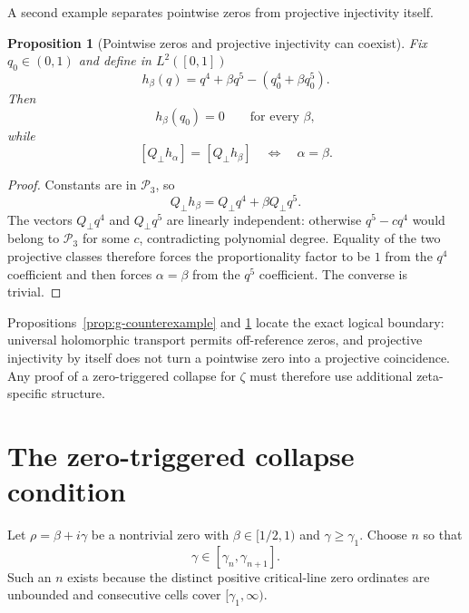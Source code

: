 \documentclass[11pt]{amsart}
\numberwithin{equation}{section}
\newtheorem{proposition}[theorem]{Proposition}
\newcommand{\Pcal}{\mathcal P}
\begin{document}
A second example separates pointwise zeros from projective injectivity itself.

\begin{proposition}[Pointwise zeros and projective injectivity can coexist]
\label{prop:l2-counterexample}
Fix $q_0\in(0,1)$ and define in $L^2([0,1])$
\begin{equation}
 h_\beta(q)=q^4+\beta q^5-(q_0^4+\beta q_0^5).
 \label{eq:h-counterexample}
\end{equation}
Then
\begin{equation}
 h_\beta(q_0)=0
 \qquad\text{for every }\beta,
 \label{eq:h-common-zero}
\end{equation}
while
\begin{equation}
 \boxed{
 [Q_\perp h_\alpha]=[Q_\perp h_\beta]
 \quad\Longleftrightarrow\quad
 \alpha=\beta.
 }
 \label{eq:h-projective-injective}
\end{equation}
\end{proposition}

\begin{proof}
Constants are in $\Pcal_3$, so
\begin{equation}
 Q_\perp h_\beta=Q_\perp q^4+\beta Q_\perp q^5.
 \label{eq:h-projection}
\end{equation}
The vectors $Q_\perp q^4$ and $Q_\perp q^5$ are linearly independent:
otherwise $q^5-cq^4$ would belong to $\Pcal_3$ for some $c$, contradicting
polynomial degree.  Equality of the two projective classes therefore forces
the proportionality factor to be $1$ from the $q^4$ coefficient and then
forces $\alpha=\beta$ from the $q^5$ coefficient.  The converse is trivial.
\end{proof}

Propositions~\ref{prop:g-counterexample} and \ref{prop:l2-counterexample}
locate the exact logical boundary: universal holomorphic transport permits
off-reference zeros, and projective injectivity by itself does not turn a
pointwise zero into a projective coincidence.  Any proof of a zero-triggered
collapse for $\zeta$ must therefore use additional zeta-specific structure.

\section{The zero-triggered collapse condition}
\label{sec:zero-triggered-collapse}

Let $\rho=\beta+i\gamma$ be a nontrivial zero with
$\beta\in[1/2,1)$ and $\gamma\geq\gamma_1$.  Choose $n$ so that
\begin{equation}
 \gamma\in[\gamma_n,\gamma_{n+1}].
 \label{eq:zero-containing-cell}
\end{equation}
Such an $n$ exists because the distinct positive critical-line zero ordinates
are unbounded and consecutive cells cover $[\gamma_1,\infty)$.
\end{document}
